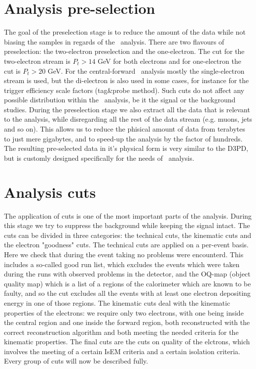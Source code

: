 \section{Analysis pre-selection}
\label{sec:Sel_pre-sel}

The goal of the preselection stage is to reduce the amount of the data while not biasing the samples in regards of the \Zee\ analysis. There are two flavours of preselection: the two-electron preselection and the one-electron. The cut for the two-electron stream is $P_{t} > 14$ GeV for both electrons and for one-electron the cut is $P_{t} > 20$ GeV. For the central-forward \Zee\ analysis mostly the single-electron stream is used, but the di-electron is also used in some cases, for instance for the trigger efficiency scale factors (tag\&probe method). Such cuts do not affect any possible distribution within the \Zee\ analysis, be it the signal or the background studies. During the preselection stage we also extract all the data that is relevant to the analysis, while disregarding all the rest of the data stream (e.g. muons, jets and so on). This allows us to reduce the phisical amount of data from terabytes to just mere gigabytes, and to speed-up the analysis by the factor of hundreds. The resulting pre-selected data in it's physical form is very similar to the D3PD, but is customly designed specifically for the needs of \Zee\ analysis.

\section{Analysis cuts}
\label{sec:Sel_cuts}

The application of cuts is one of the most important parts of the analysis. During this stage we try to suppress the background while keeping the signal intact. The cuts can be divided in three categories: the technical cuts, the kinematic cuts and the electron "goodness" cuts. The technical cuts are applied on a per-event basis. Here we check that during the event taking no problems were encounterd. This includes a so-called good run list, which excludes the events which were taken during the runs with observed problems in the detector, and the OQ-map (object quality map) which is a list of a regions of the calorimeter which are known to be faulty, and so the cut excludes all the events with at least one electron depositing energy in one of those regions. The kinematic cuts deal with the kinematic properties of the electrons: we require only two electrons, with one being inside the central region and one inside the forward region, both reconstructed with the correct reconstruction algorithm and both meeting the needed criteria for the kinematic properties. The final cuts are the cuts on quality of the elctrons, which involves the meeting of a certain IsEM criteria and a certain isolation criteria. Every group of cuts will now be described fully.

